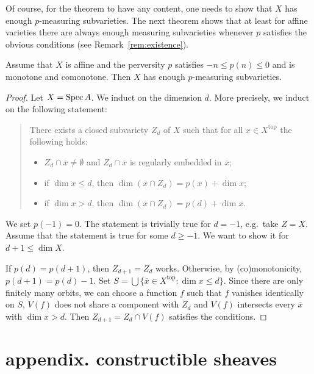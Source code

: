 \documentclass[english,biblatex-alpha,bw]{short-notes}
\begin{document}
Of course, for the theorem to have any content, one needs to show that $X$ has enough $p$-measuring subvarieties.
The next theorem shows that at least for affine varieties there are always enough measuring subvarieties whenever $p$ satisfies the obvious conditions (see Remark~\ref{rem:existence}).

\begin{Thm}\label{thm:existance}%
    Assume that $X$ is affine and the perversity $p$ satisfies $-n \le p(n) \le 0$ and is monotone and comonotone.
    Then $X$ has enough $p$-measuring subvarieties.
\end{Thm}

\begin{proof}
    Let $X = \operatorname{Spec} A$.
    We induct on the dimension $d$.
    More precisely, we induct on the following statement:
    \begin{quote}
        There exists a closed subvariety $Z_d$ of $X$ such that for all $x ∈ X^{\mathrm{top}}$ the following holds:
        \begin{itemize}
            \item $Z_d \cap \overline x \ne \emptyset$ and $Z_d \cap \overline x$ is regularly embedded in $\overline x$;
            \item if $\dim x \le d$, then $\dim(\overline x ∩ Z_d) = p(x) + \dim x$;
            \item if $\dim x > d$, then $\dim(\overline x ∩ Z_d) = p(d) + \dim x$.
        \end{itemize}
    \end{quote}
    We set $p(-1) = 0$.
    The statement is trivially true for $d = -1$, e.g.~take $Z = X$.
    Assume that the statement is true for some $d \ge -1$.
    We want to show it for $d+1 \le \dim X$.

    If $p(d) = p(d+1)$, then $Z_{d+1} = Z_{d}$ works.
    Otherwise, by (co)monotonicity, $p(d+1) = p(d) - 1$.
    Set $S = \bigcup \{ \overline x ∈ X^{\mathrm{top}} : \dim x \le d\}$.
    Since there are only finitely many orbits, we can choose a function $f$ such that $f$ vanishes identically on $S$, $V(f)$ does not share a component with $Z_d$ and $V(f)$ intersects every $\overline x$ with $\dim x > d$.
    Then $Z_{d+1} = Z_d \cap V(f)$ satisfies the conditions.
\end{proof}

\appendix

\section*{appendix. constructible sheaves}
\end{document}
